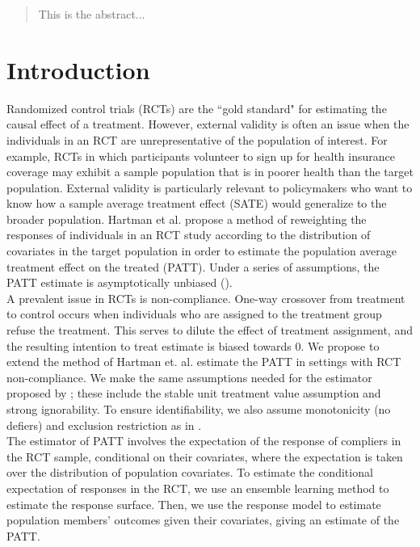 \documentclass[12pt]{article}
\begin{document}
    
\maketitle  
\thispagestyle{empty}
\begin{abstract}  
\noindent This is the abstract...
\end{abstract}	


\section{Introduction}
Randomized control trials (RCTs) are the ``gold standard" for estimating the causal effect of a treatment.  However, external validity is often an issue when the individuals in an RCT are unrepresentative of the population of interest.  For example, RCTs in which participants volunteer to sign up for health insurance coverage may exhibit a sample population that is in poorer health than the target population.  External validity is particularly relevant to policymakers who want to know how a sample average treatment effect (SATE) would generalize to the broader population. Hartman et al. propose a method of reweighting the responses of individuals in an RCT study according to the distribution of covariates in the target population in order to estimate the population average treatment effect on the treated (PATT).  Under a series of assumptions, the PATT estimate is asymptotically unbiased (\cite{Hartman}). \\

A prevalent issue in RCTs is non-compliance.  One-way crossover from treatment to control occurs when individuals who are assigned to the treatment group refuse the treatment.  This serves to dilute the effect of treatment assignment, and the resulting intention to treat estimate is biased towards $0$.  We propose to extend the method of Hartman et. al. estimate the PATT in settings with RCT non-compliance.  We make the same assumptions needed for the estimator proposed by \cite{Hartman}; these include the stable unit treatment value assumption and strong ignorability.  To ensure identifiability, we also assume monotonicity (no defiers) and exclusion restriction as in \cite{Angrist1996}. \\

The estimator of PATT involves the expectation of the response of compliers in the RCT sample, conditional on their covariates, where the expectation is taken over the distribution of population covariates.  To estimate the conditional expectation of responses in the RCT, we use an ensemble learning method to estimate the response surface.  Then, we use the response model to estimate population members' outcomes given their covariates, giving an estimate of the PATT. \\
\end{document}
